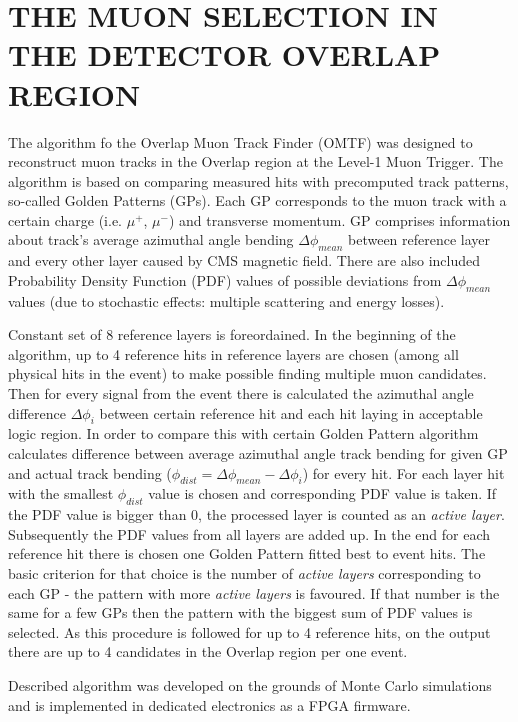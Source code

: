 \section{THE MUON SELECTION IN THE DETECTOR OVERLAP REGION}

The algorithm fo the Overlap Muon Track Finder (OMTF) was designed to reconstruct muon tracks in the Overlap region at the Level-1 Muon Trigger. The algorithm is based on comparing measured hits with precomputed track patterns, so-called Golden Patterns (GPs). Each GP corresponds to the muon track with a certain charge (i.e. $\mu^{+}$, $\mu^{-}$) and transverse momentum. GP comprises information about track's average azimuthal angle bending $\Delta \phi_{mean}$ between reference layer and every other layer caused by CMS magnetic field. There are also included Probability Density Function (PDF) values of possible deviations from $\Delta \phi_{mean}$ values (due to stochastic effects: multiple scattering and energy losses). 

Constant set of 8 reference layers is foreordained. In the beginning of the algorithm, up to 4 reference hits in reference layers are chosen (among all physical hits in the event) to make possible finding multiple muon candidates. Then for every signal from the event there is calculated the azimuthal angle difference $\Delta \phi_{i}$ between certain reference hit and each hit laying in acceptable logic region. In order to compare this with certain Golden Pattern algorithm calculates difference between average azimuthal angle track bending for given GP and actual track bending ($\phi_{dist} = \Delta\phi_{mean} - \Delta\phi_{i}$)%
 for every hit. For each layer hit with the smallest $\phi_{dist}$ value is chosen and corresponding PDF value is taken. If the PDF value is bigger than 0, the processed layer is counted as an \textit{active layer}. Subsequently the PDF values from all layers are added up. In the end for each reference hit there is chosen one Golden Pattern fitted best to event hits. The basic criterion for that choice is the number of \textit{active layers} corresponding to each GP - the pattern with more \textit{active layers} is favoured. If that number is the same for a few GPs then the pattern with the biggest sum of PDF values is selected. As this procedure is followed for up to 4 reference hits, on the output there are up to 4 candidates in the Overlap region per one event.

Described algorithm was developed on the grounds of Monte Carlo simulations and is implemented in dedicated electronics as a FPGA firmware.
%
\cite{OMTF-Wilga2014}
